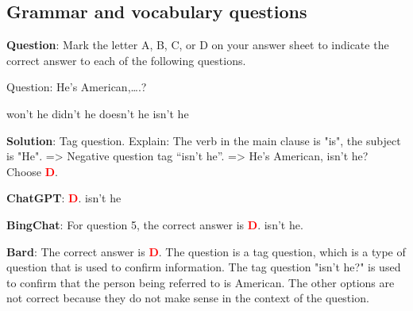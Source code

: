 \documentclass[11pt]{article}
\begin{document}
\subsection{Grammar and vocabulary questions}

\begin{mdframed}[linewidth=1pt,linecolor=red] \textbf{Question}: Mark the letter A, B, C, or D on your answer sheet to indicate the correct answer to each of the following questions. 
	
	Question: He’s American,….?
	
	\begin{choices}
		\choice won’t he 
		\choice didn’t he 	
		\choice doesn’t he 
		\choice isn’t he
	\end{choices}
	
	\textbf{Solution}: Tag question. Explain:
	The verb in the main clause is "is", the subject is "He".
	=> Negative question tag “isn't he”.
	=> He's American, isn't he?
	Choose \textcolor{red}{\textbf{D}}. 
	
	\textbf{ChatGPT}: \textcolor{red}{\textbf{D}}. isn't he 
	
	\textbf{BingChat}: For question 5, the correct answer is \textcolor{red}{\textbf{D}}. isn’t he.
	
	\textbf{Bard}: The correct answer is \textcolor{red}{\textbf{D}}. The question is a tag question, which is a type of question that is used to confirm information. The tag question "isn't he?" is used to confirm that the person being referred to is American. The other options are not correct because they do not make sense in the context of the question.
	
		
\end{mdframed}
\end{document}

